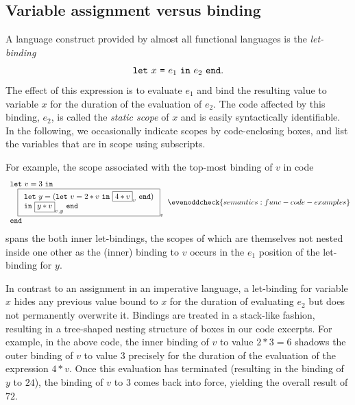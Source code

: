 \subsection{Variable assignment versus binding}
\label{section:Part1:Semantics:Binding}
A language construct provided by almost all functional languages is
the \emph{let-binding} $$\texttt{let}\ {x}\ \texttt{=}\ {e_1}\ \texttt{in}\ {e_2}\ \texttt{end}.$$ The effect of this
expression is to evaluate $e_1$ and bind the resulting value to
variable $x$ for the duration of the evaluation of $e_2$.  The code
affected by this binding, $e_2$, is called the \emph{static scope} of
$x$ and is easily syntactically identifiable.  In the following, we
occasionally indicate scopes by code-enclosing boxes, and list the
variables that are in scope using subscripts.

For example, the scope associated with the top-most binding of $v$ in
code
\begin{equation}
\label{FunctionalCodeExample1}
\begin{array}{l}
\texttt{let}\ v = 3\ \texttt{in}\\
\quad 
  \fbox{$
   \begin{array}[t]{l} 
    \texttt{let}\ y = (\texttt{let}\ v=2*v \ \texttt{in}\ \fbox{$4*v$}_v\ \texttt{end})\\
    \texttt{in}\ \fbox{$y*v$}_{v,y}\ \texttt{end}\\
\end{array}$}_v\\
\texttt{end}
\end{array}
  \evenoddcheck{semantics:func-code-examples}
\end{equation}
spans the both inner let-bindings, the scopes of which are themselves
not nested inside one other as the (inner) binding to $v$ occurs in
the $e_1$ position of the let-binding for $y$.

In contrast to an assignment in an imperative language, a let-binding
for variable $x$ hides any previous value bound to $x$ for the
duration of evaluating $e_2$ but does not permanently overwrite
it. Bindings are treated in a stack-like fashion, resulting in a
tree-shaped nesting structure of boxes in our code excerpts.
For example, in the above code, the inner binding of $v$ to value
$2*3=6$ shadows the outer binding of $v$ to value $3$ precisely for
the duration of the evaluation of the expression $4*v$. Once this
evaluation has terminated (resulting in the binding of $y$ to $24$),
the binding of $v$ to $3$ comes back into force, yielding the overall
result of $72$.

